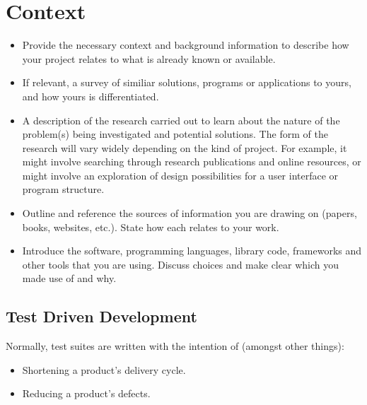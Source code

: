 \section{Context}
\label{sec:context}

\begin{mdframed}
	\begin{itemize}
		\item Provide the necessary context and background information to describe how your project relates to what is already known or available.
		\item If relevant, a survey of similiar solutions, programs or applications to yours, and how yours is differentiated.
		\item A description of the research carried out to learn about the nature of the problem(s) being investigated and potential solutions. The form of the research will vary widely depending on the kind of project. For example, it might involve searching through research publications and online resources, or might involve an exploration of design possibilities for a user interface or program structure.
		\item Outline and reference the sources of information you are drawing on (papers, books, websites, etc.). State how each relates to your work.
		\item Introduce the software, programming languages, library code, frameworks and other tools that you are using. Discuss choices and make clear which you made use of and why.
	\end{itemize}
\end{mdframed}


\subsection{Test Driven Development}

Normally, test suites are written with the intention of (amongst other things):
\begin{itemize}
	\item Shortening a product's delivery cycle.
	\item Reducing a product's defects.
\end{itemize}

